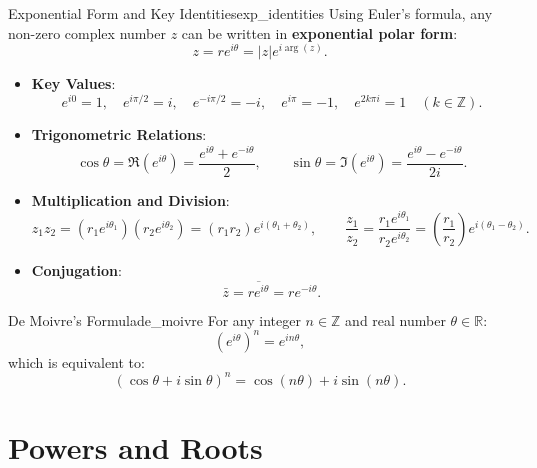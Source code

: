 \begin{proposition}{Exponential Form and Key Identities}{exp_identities}
Using Euler's formula, any non-zero complex number $z$ can be written in \textbf{exponential polar form}:
\begin{equation}
z = r e^{i\theta} = |z| e^{i \arg(z)}.
\end{equation}
\begin{itemize}
    \item \textbf{Key Values}:
    \begin{equation}
    e^{i0} = 1, \quad e^{i\pi/2} = i, \quad e^{-i\pi/2} = -i, \quad e^{i\pi} = -1, \quad e^{2k\pi i} = 1 \quad (k \in \mathbb{Z}).
    \end{equation}
    \item \textbf{Trigonometric Relations}:
    \begin{equation}
    \cos\theta = \Re(e^{i\theta}) = \frac{e^{i\theta} + e^{-i\theta}}{2}, \qquad \sin\theta = \Im(e^{i\theta}) = \frac{e^{i\theta} - e^{-i\theta}}{2i}.
    \end{equation}
    \item \textbf{Multiplication and Division}:
    \begin{equation}
    z_1 z_2 = (r_1 e^{i\theta_1})(r_2 e^{i\theta_2}) = (r_1 r_2) e^{i(\theta_1 + \theta_2)}, \qquad \frac{z_1}{z_2} = \frac{r_1 e^{i\theta_1}}{r_2 e^{i\theta_2}} = \left(\frac{r_1}{r_2}\right) e^{i(\theta_1 - \theta_2)}.
    \end{equation}
    \item \textbf{Conjugation}:
    \begin{equation}
    \bar{z} = \overline{r e^{i\theta}} = r e^{-i\theta}.
    \end{equation}
\end{itemize}
\end{proposition}

\begin{theorem}{De Moivre's Formula}{de_moivre}
For any integer $n \in \mathbb{Z}$ and real number $\theta \in \mathbb{R}$:
\begin{equation}
(e^{i\theta})^n = e^{i n\theta},
\end{equation}
which is equivalent to:
\begin{equation}
(\cos\theta + i \sin\theta)^n = \cos(n\theta) + i \sin(n\theta).
\end{equation}
\end{theorem}


\section{Powers and Roots}

